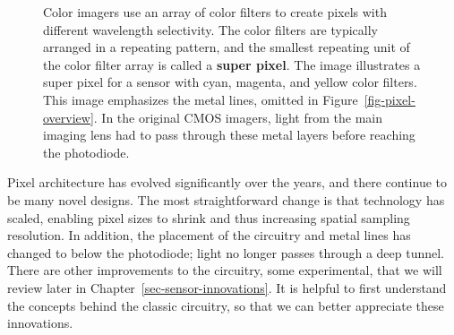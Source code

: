 \documentclass[
  letterpaper,
]{book}
\begin{document}
\begin{figure}


\caption{\label{fig-pixel-layers}Color imagers use an array of color
filters to create pixels with different wavelength selectivity. The
color filters are typically arranged in a repeating pattern, and the
smallest repeating unit of the color filter array is called a
\textbf{super pixel}. The image illustrates a super pixel for a sensor
with cyan, magenta, and yellow color filters. This image emphasizes the
metal lines, omitted in Figure~\ref{fig-pixel-overview}. In the original
CMOS imagers, light from the main imaging lens had to pass through these
metal layers before reaching the photodiode.}

\end{figure}%

Pixel architecture has evolved significantly over the years, and there
continue to be many novel designs. The most straightforward change is
that technology has scaled, enabling pixel sizes to shrink and thus
increasing spatial sampling resolution. In addition, the placement of
the circuitry and metal lines has changed to below the photodiode; light
no longer passes through a deep tunnel. There are other improvements to
the circuitry, some experimental, that we will review later in
Chapter~\ref{sec-sensor-innovations}. It is helpful to first understand
the concepts behind the classic circuitry, so that we can better
appreciate these innovations.
\end{document}
